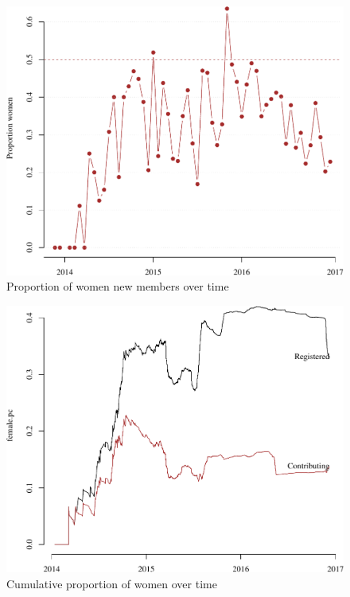 \begin{frame}

\begin{figure}
\centering
\includegraphics{deck_files/figure-beamer/overtime-1.pdf}
\caption{Proportion of women new members over time}
\end{figure}

\end{frame}

\begin{frame}

\begin{figure}
\centering
\includegraphics{deck_files/figure-beamer/cumsum-1.pdf}
\caption{Cumulative proportion of women over time}
\end{figure}

\end{frame}

